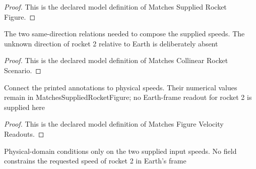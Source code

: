 \begin{proof}
  This is the declared model definition of Matches Supplied Rocket Figure.
\end{proof}
\begin{definition}
  \label{def:physics:phyx-mini-0621:phyxminiproblems-problemphyxmini0621-matchescollinearrocketscenario}
  The two same-direction relations needed to compose the supplied speeds. The unknown direction of rocket 2 relative to Earth is deliberately absent
\end{definition}
\begin{proof}
  This is the declared model definition of Matches Collinear Rocket Scenario.
\end{proof}
\begin{definition}
  \label{def:physics:phyx-mini-0621:phyxminiproblems-problemphyxmini0621-matchesfigurevelocityreadouts}
  Connect the printed annotations to physical speeds. Their numerical values remain in MatchesSuppliedRocketFigure; no Earth-frame readout for rocket 2 is supplied here
\end{definition}
\begin{proof}
  This is the declared model definition of Matches Figure Velocity Readouts.
\end{proof}
\begin{definition}
  \label{def:physics:phyx-mini-0621:phyxminiproblems-problemphyxmini0621-hasphysicalinputspeeds}
  Physical-domain conditions only on the two supplied input speeds. No field constrains the requested speed of rocket 2 in Earth's frame
\end{definition}
